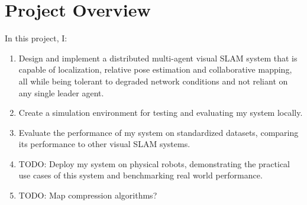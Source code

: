 \section{Project Overview}
\label{sec:project-overview}
In this project, I: \noparskip
{
    \begin{enumerate}
        \item Design and implement a distributed multi-agent visual SLAM system that is capable of localization, relative pose estimation and  collaborative mapping, all while being tolerant to degraded network conditions and not reliant on any single leader agent.
        \item Create a simulation environment for testing and evaluating my system locally.
        \item Evaluate the performance of my system on standardized datasets, comparing its performance to other visual SLAM systems.
        \item TODO: Deploy my system on physical robots, demonstrating the practical use cases of this system and benchmarking real world performance.
        \item TODO: Map compression algorithms?
    \end{enumerate}
}
